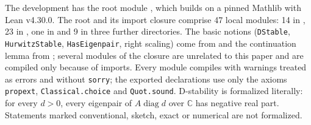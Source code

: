 \documentclass[11pt,a4paper]{article}
\theoremstyle{plain}
\theoremstyle{definition}
\newcommand{\C}{\mathbb{C}}
\newcommand{\diag}{\operatorname{diag}}
\begin{document}
The development  has the root module , which builds on a pinned Mathlib
with Lean v4.30.0. The root and its import closure comprise 47 local modules: 14 in ,
23 in , one in  and 9 in three further
directories. The basic notions (\texttt{DStable}, \texttt{HurwitzStable}, \texttt{HasEigenpair}, right scaling) come
from  and the continuation lemma from
; several modules of the closure are unrelated to
this paper and are compiled only because of imports. Every module compiles with warnings treated as errors and without
\texttt{sorry}; the exported declarations use only the axioms \texttt{propext}, \texttt{Classical.choice} and
\texttt{Quot.sound}. D-stability is formalized literally: for every $d>0$, every eigenpair of $A\diag d$ over $\C$ has
negative real part. Statements marked conventional, sketch, exact or numerical are not formalized.
\end{document}
